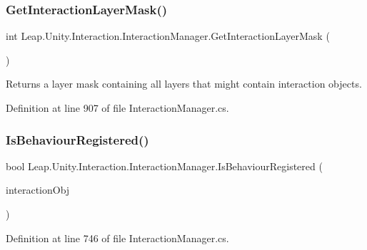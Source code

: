 \subsubsection{\texorpdfstring{GetInteractionLayerMask()}{GetInteractionLayerMask()}}
{\footnotesize\ttfamily int Leap.\+Unity.\+Interaction.\+Interaction\+Manager.\+Get\+Interaction\+Layer\+Mask (\begin{DoxyParamCaption}{ }\end{DoxyParamCaption})}



Returns a layer mask containing all layers that might contain interaction objects. 



Definition at line 907 of file Interaction\+Manager.\+cs.

\mbox{\label{class_leap_1_1_unity_1_1_interaction_1_1_interaction_manager_a98a566e73eea4c336c32fad4a89f8502}} 
\subsubsection{\texorpdfstring{IsBehaviourRegistered()}{IsBehaviourRegistered()}}
{\footnotesize\ttfamily bool Leap.\+Unity.\+Interaction.\+Interaction\+Manager.\+Is\+Behaviour\+Registered (\begin{DoxyParamCaption}\item[{\mbox{\hyperlink{interface_leap_1_1_unity_1_1_interaction_1_1_i_interaction_behaviour}{I\+Interaction\+Behaviour}}}]{interaction\+Obj }\end{DoxyParamCaption})}



Definition at line 746 of file Interaction\+Manager.\+cs.

\mbox{\label{class_leap_1_1_unity_1_1_interaction_1_1_interaction_manager_ad85d00ee53f6c8569a27ffbc1c582724}} 

